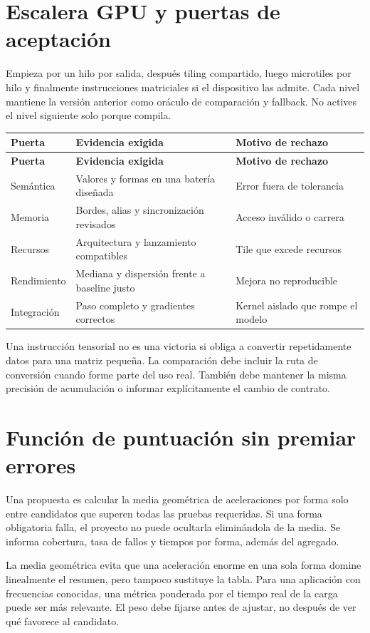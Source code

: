 \documentclass[12pt,a4paper,oneside]{report}
\begin{document}
\section{Escalera GPU y puertas de aceptación}
Empieza por un hilo por salida, después tiling compartido, luego microtiles por hilo y finalmente instrucciones matriciales si el dispositivo las admite. Cada nivel mantiene la versión anterior como oráculo de comparación y fallback. No actives el nivel siguiente solo porque compila.

{\small
\begin{longtable}{@{}P{0.28\textwidth}P{0.32\textwidth}P{0.34\textwidth}@{}}
\toprule
\textbf{Puerta} & \textbf{Evidencia exigida} & \textbf{Motivo de rechazo}\\
\midrule
\endfirsthead
\toprule
\textbf{Puerta} & \textbf{Evidencia exigida} & \textbf{Motivo de rechazo}\\
\midrule
\endhead
Semántica & Valores y formas en una batería diseñada & Error fuera de tolerancia\\
Memoria & Bordes, alias y sincronización revisados & Acceso inválido o carrera\\
Recursos & Arquitectura y lanzamiento compatibles & Tile que excede recursos\\
Rendimiento & Mediana y dispersión frente a baseline justo & Mejora no reproducible\\
Integración & Paso completo y gradientes correctos & Kernel aislado que rompe el modelo\\
\bottomrule
\end{longtable}
}
Una instrucción tensorial no es una victoria si obliga a convertir repetidamente datos para una matriz pequeña. La comparación debe incluir la ruta de conversión cuando forme parte del uso real. También debe mantener la misma precisión de acumulación o informar explícitamente el cambio de contrato.

\section{Función de puntuación sin premiar errores}
Una propuesta es calcular la media geométrica de aceleraciones por forma solo entre candidatos que superen todas las pruebas requeridas. Si una forma obligatoria falla, el proyecto no puede ocultarla eliminándola de la media. Se informa cobertura, tasa de fallos y tiempos por forma, además del agregado.

La media geométrica evita que una aceleración enorme en una sola forma domine linealmente el resumen, pero tampoco sustituye la tabla. Para una aplicación con frecuencias conocidas, una métrica ponderada por el tiempo real de la carga puede ser más relevante. El peso debe fijarse antes de ajustar, no después de ver qué favorece al candidato.
\end{document}
